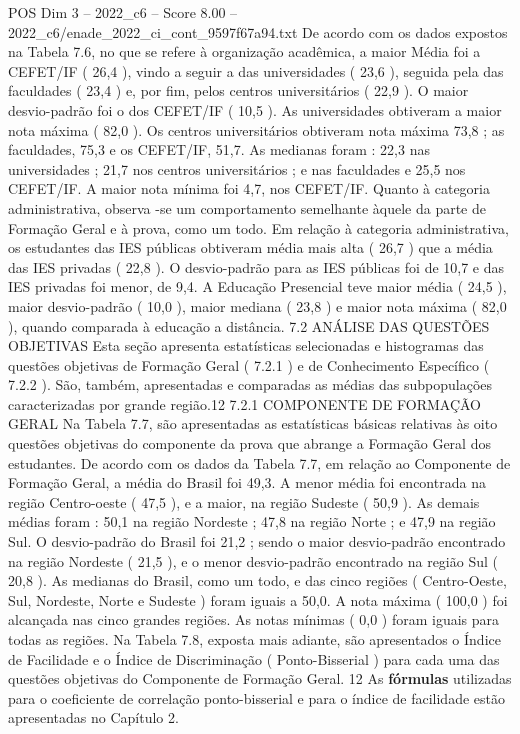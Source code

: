 \begin{textsample}{POS Dim 3 – 2022\_c6 – Score 8.00 – 2022\_c6/enade\_2022\_ci\_cont\_9597f67a94.txt}
De acordo com os dados expostos na Tabela 7.6, no que se refere à organização acadêmica, a maior Média foi a CEFET/IF ( 26,4 ), vindo a seguir a das universidades ( 23,6 ), seguida pela das faculdades ( 23,4 ) e, por fim, pelos centros universitários ( 22,9 ).
O maior desvio-padrão foi o dos CEFET/IF ( 10,5 ).
As universidades obtiveram a maior nota máxima ( 82,0 ).
Os centros universitários obtiveram nota máxima 73,8 ; as faculdades, 75,3 e os CEFET/IF, 51,7.
As medianas foram : 22,3 nas universidades ; 21,7 nos centros universitários ; e nas faculdades e 25,5 nos CEFET/IF.
A maior nota mínima foi 4,7, nos CEFET/IF.
Quanto à categoria administrativa, observa -se um comportamento semelhante àquele da parte de Formação Geral e à prova, como um todo.
Em relação à categoria administrativa, os estudantes das IES públicas obtiveram média mais alta ( 26,7 ) que a média das IES privadas ( 22,8 ).
O desvio-padrão para as IES públicas foi de 10,7 e das IES privadas foi menor, de 9,4.
A Educação Presencial teve maior média ( 24,5 ), maior desvio-padrão ( 10,0 ), maior mediana ( 23,8 ) e maior nota máxima ( 82,0 ), quando comparada à educação a distância. 7.2 ANÁLISE DAS QUESTÕES OBJETIVAS Esta seção apresenta estatísticas selecionadas e histogramas das questões objetivas de Formação Geral ( 7.2.1 ) e de Conhecimento Específico ( 7.2.2 ).
São, também, apresentadas e comparadas as médias das subpopulações caracterizadas por grande região.12 7.2.1 COMPONENTE DE FORMAÇÃO GERAL Na Tabela 7.7, são apresentadas as estatísticas básicas relativas às oito questões objetivas do componente da prova que abrange a Formação Geral dos estudantes.
De acordo com os dados da Tabela 7.7, em relação ao Componente de Formação Geral, a média do Brasil foi 49,3.
A menor média foi encontrada na região Centro-oeste ( 47,5 ), e a maior, na região Sudeste ( 50,9 ).
As demais médias foram : 50,1 na região Nordeste ; 47,8 na região Norte ; e 47,9 na região Sul.
O desvio-padrão do Brasil foi 21,2 ; sendo o maior desvio-padrão encontrado na região Nordeste ( 21,5 ), e o menor desvio-padrão encontrado na região Sul ( 20,8 ).
As medianas do Brasil, como um todo, e das cinco regiões ( Centro-Oeste, Sul, Nordeste, Norte e Sudeste ) foram iguais a 50,0.
A nota máxima ( 100,0 ) foi alcançada nas cinco grandes regiões.
As notas mínimas ( 0,0 ) foram iguais para todas as regiões.
Na Tabela 7.8, exposta mais adiante, são apresentados o Índice de Facilidade e o Índice de Discriminação ( Ponto-Bisserial ) para cada uma das questões objetivas do Componente de Formação Geral. 12 As \textbf{fórmulas} utilizadas para o coeficiente de correlação ponto-bisserial e para o índice de facilidade estão apresentadas no Capítulo 2.

\end{textsample}

